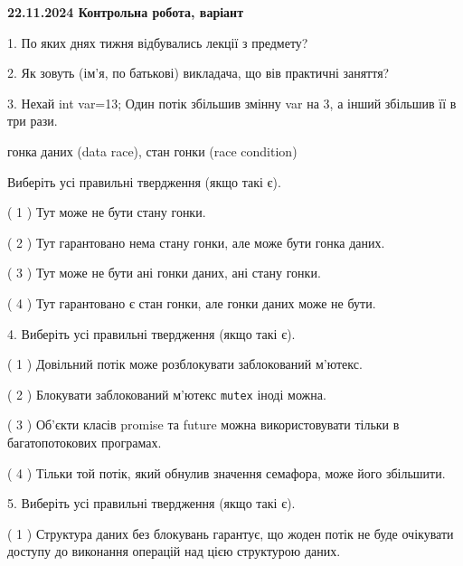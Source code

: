 \documentclass[12pt, ukrainian]{article}
\def\code#1{\Verb!#1!}
\begin{document}
\vspace{4mm}
\newpage
\begin {large}

\textbf{22.11.2024 Контрольна робота, варіант  }\par


{
1. По яких днях тижня відбувались лекції з предмету?



\vspace{5mm}
2. Як зовуть (ім'я, по батькові) викладача, що вів практичні заняття?



\vspace{5mm}
3. Нехай int var=13; Один потік збільшив змінну var на 3, а інший збільшив її в три рази.

гонка даних (data race), стан гонки (race condition)

Виберіть усі правильні твердження (якщо такі є).\par
\vspace{2mm}
( 1 ) Тут може не бути стану гонки.%

( 2 ) Тут гарантовано нема стану гонки, але може бути гонка даних.%

( 3 ) Тут може не бути ані гонки даних, ані стану гонки.%

( 4 ) Тут гарантовано є стан гонки, але гонки даних може не бути.%


\vspace{5mm}
4. Виберіть усі правильні твердження (якщо такі є).\par
\vspace{2mm}

( 1 ) Довільний потік може розблокувати заблокований м’ютекс.%

( 2 ) Блокувати заблокований м’ютекс  \code{mutex} іноді можна.%

( 3 ) Об’єкти класів promise та future можна використовувати тільки в багатопотокових програмах.%

( 4 ) Тільки той потік, який обнулив значення семафора, може його збільшити.%


\vspace{5mm}
5. Виберіть усі правильні твердження (якщо такі є).\par
\vspace{2mm}

( 1 ) Структура даних без блокувань гарантує, що жоден потік не буде очікувати доступу до виконання операцій над цією структурою даних.%

}
\end{large}
\end{document}
